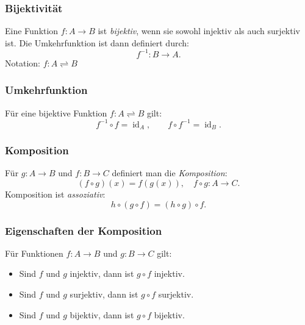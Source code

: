 \subsubsection{Bijektivität}
Eine Funktion $f : A \to B$ ist \emph{bijektiv}, wenn sie sowohl injektiv als auch surjektiv ist. Die Umkehrfunktion ist dann definiert durch:
\[
f^{-1} : B \to A.
\]
Notation: \(f : A \rightleftharpoons B\)


\subsubsection{Umkehrfunktion}
Für eine bijektive Funktion $f : A \rightleftharpoons B$ gilt:
\[
f^{-1} \circ f = \operatorname{id}_A, \qquad f \circ f^{-1} = \operatorname{id}_B.
\]

\subsubsection{Komposition}
Für $g : A \to B$ und $f : B \to C$ definiert man die \emph{Komposition}:
\[
(f \circ g)(x) = f(g(x)), \quad f \circ g : A \to C.
\]
Komposition ist \emph{assoziativ}:
\[
h \circ (g \circ f) = (h \circ g) \circ f.
\]

\subsubsection{Eigenschaften der Komposition}
Für Funktionen $f : A \to B$ und $g : B \to C$ gilt:
\begin{itemize}
  \item Sind $f$ und $g$ injektiv, dann ist $g \circ f$ injektiv.
  \item Sind $f$ und $g$ surjektiv, dann ist $g \circ f$ surjektiv.
  \item Sind $f$ und $g$ bijektiv, dann ist $g \circ f$ bijektiv.
\end{itemize}

